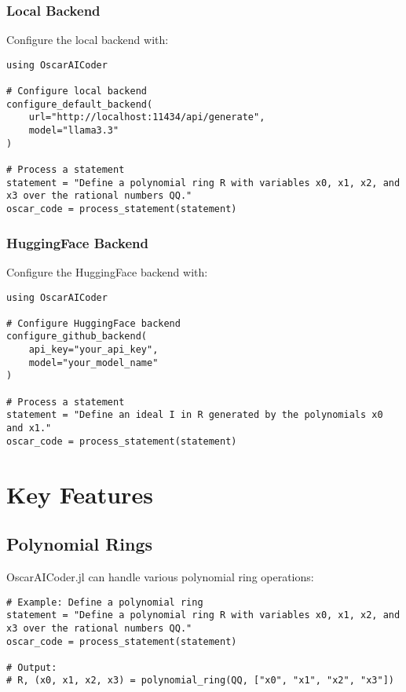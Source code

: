 \documentclass[11pt,a4paper]{article}
\begin{document}
\subsubsection{Local Backend}

Configure the local backend with:

\begin{lstlisting}
using OscarAICoder

# Configure local backend
configure_default_backend(
    url="http://localhost:11434/api/generate",
    model="llama3.3"
)

# Process a statement
statement = "Define a polynomial ring R with variables x0, x1, x2, and x3 over the rational numbers QQ."
oscar_code = process_statement(statement)
\end{lstlisting}

\subsubsection{HuggingFace Backend}

Configure the HuggingFace backend with:

\begin{lstlisting}
using OscarAICoder

# Configure HuggingFace backend
configure_github_backend(
    api_key="your_api_key",
    model="your_model_name"
)

# Process a statement
statement = "Define an ideal I in R generated by the polynomials x0 and x1."
oscar_code = process_statement(statement)
\end{lstlisting}

\section{Key Features}

\subsection{Polynomial Rings}

OscarAICoder.jl can handle various polynomial ring operations:

\begin{lstlisting}
# Example: Define a polynomial ring
statement = "Define a polynomial ring R with variables x0, x1, x2, and x3 over the rational numbers QQ."
oscar_code = process_statement(statement)

# Output:
# R, (x0, x1, x2, x3) = polynomial_ring(QQ, ["x0", "x1", "x2", "x3"])
\end{lstlisting}
\end{document}
